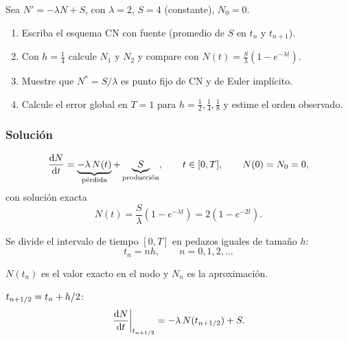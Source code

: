 
\begin{enunciado}
	Sea $N' = -\lambda N + S$, con $\lambda = 2$, $S = 4$ (constante), $N_0 = 0$.
	\begin{enumerate}[label=(\alph*)]
		\item Escriba el esquema CN con fuente (promedio de $S$ en $t_n$ y $t_{n+1}$).
		\item Con $h = \frac14$ calcule $N_1$ y $N_2$ y compare con
		$N(t) = \frac{S}{\lambda}\left(1 - e^{-\lambda t}\right)$.
		\item Muestre que $N^* = S/\lambda$ es punto fijo de CN y de Euler implícito.
		\item Calcule el error global en $T = 1$ para $h = \frac12, \frac14, \frac18$ y estime el orden observado.
	\end{enumerate}
\end{enunciado}

\subsubsection*{Solución}
\[
\frac{\mathrm{d} N}{\mathrm{d} t} = \underbrace{-\lambda\,N(t)}_{\text{pérdida}} + \underbrace{S}_{\text{producción}},
\qquad t \in [0, T], \qquad N(0) = N_0 = 0,
\]
con solución exacta
\[
N(t) = \frac{S}{\lambda}\left(1 - e^{-\lambda t}\right) = 2\left(1 - e^{-2t}\right).
\]


Se divide el intervalo de tiempo $[0, T]$ en pedazos iguales de tamaño $h$:
\[
t_n = n h, \qquad n = 0, 1, 2, \dots
\]

$N(t_n)$ es el valor exacto en el nodo y $N_n$ es la aproximación.

$t_{n+1/2} = t_n + h/2$:
\[
\left.\frac{\mathrm{d} N}{\mathrm{d} t}\right|_{t_{n+1/2}} = -\lambda\, N(t_{n+1/2}) + S .
\]

